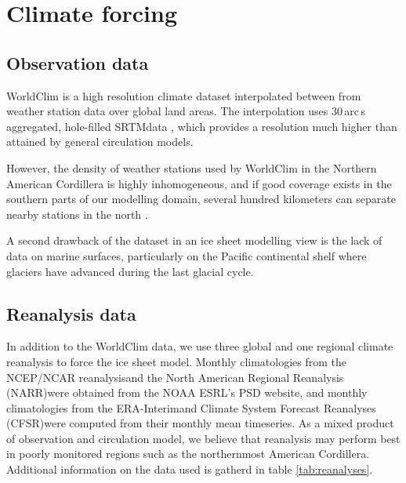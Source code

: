 
\section{Climate forcing}
\label{sec:climate}

\subsection{Observation data}

WorldClim \citep{data:worldclim} is a high resolution climate dataset interpolated between from weather station data over global land areas. The interpolation uses 30\,arc\,s aggregated, hole-filled SRTM\needref data , which provides a resolution much higher than attained by general circulation models.

However, the density of weather stations used by WorldClim in the Northern American Cordillera is highly inhomogeneous, and if good coverage exists in the southern parts of our modelling domain, several hundred kilometers can separate nearby stations in the north \citep{data:worldclim}.

A second drawback of the dataset in an ice sheet modelling view is the lack of data on marine surfaces, particularly on the Pacific continental shelf where glaciers have advanced during the last glacial cycle\needref.


\subsection{Reanalysis data}

In addition to the WorldClim data, we use three global and one regional climate reanalysis to force the ice sheet model. Monthly climatologies from the NCEP/NCAR reanalysis\needref and the North American Regional Reanalysis (NARR)\needref were obtained from the NOAA ESRL's PSD website\needref, and monthly climatologies from the ERA-Interim\needref and Climate System Forecast Reanalyses (CFSR)\needref were computed from their monthly mean timeseries. As a mixed product of observation and circulation model, we believe that reanalysis may perform best in poorly monitored regions such as the northernmost American Cordillera. Additional information on the data used is gatherd in table \ref{tab:reanalyses}.

